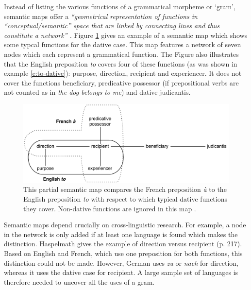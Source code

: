  Instead of listing the various functions of a grammatical morpheme or `gram', semantic maps offer a {\em ``geometrical representation of functions in ``conceptual/semantic'' space that are linked by connecting lines and thus constitute a network'' \citep[p. 213]{haspelmath03geometry}.} Figure \ref{f:semmap-to} gives an example of a semantic map which shows some typcal functions for the dative case. This map features a network of seven nodes which each represent a grammatical function. The Figure also illustrates that the English preposition {\em to} covers four of these functions (as was shown in example \ref{e:to-dative}): purpose, direction, recipient and experiencer. It does not cover the functions beneficiary, predicative possessor (if prepositional verbs are not counted as in {\em the dog belongs to me}) and dative judicantis.
\begin{figure}[t]
\centerline{\includegraphics[width=\textwidth]{Chapter5/figs/semmap-to}}
  \caption[A semantic map of dative functions for {\em to} \citep{haspelmath03geometry}]{This partial semantic map compares the French preposition {\em \`{a}} to the English preposition {\em to} with respect to which typical dative functions they cover. Non-dative functions are ignored in this map \citep[adapted from][figures 8.1 and 8.2, p. 213 and 215]{haspelmath03geometry}.}
   \label{f:semmap-to}
\end{figure}

Semantic maps depend crucially on cross-linguistic research. For example, a node in the network is only added if at least one language is found which makes the distinction. Haspelmath gives the example of direction versus recipient (p. 217). Based on English and French, which use one preposition for
both functions, this distinction could not be made. However, German uses {\em zu} or {\em nach} for direction, whereas it uses the dative case for recipient. A large sample set of languages is therefore needed to uncover all the uses of a gram.

